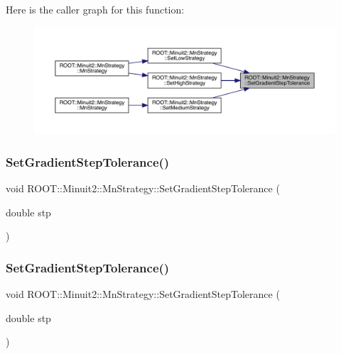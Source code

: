 Here is the caller graph for this function\+:
\nopagebreak
\begin{figure}[H]
\begin{center}
\leavevmode
\includegraphics[width=350pt]{da/de4/classROOT_1_1Minuit2_1_1MnStrategy_ad6051100db67df070103c2478740ee8f_icgraph}
\end{center}
\end{figure}
\mbox{\label{classROOT_1_1Minuit2_1_1MnStrategy_ad6051100db67df070103c2478740ee8f}} 
\subsubsection{\texorpdfstring{SetGradientStepTolerance()}{SetGradientStepTolerance()}\hspace{0.1cm}{\footnotesize\ttfamily [2/3]}}
{\footnotesize\ttfamily void R\+O\+O\+T\+::\+Minuit2\+::\+Mn\+Strategy\+::\+Set\+Gradient\+Step\+Tolerance (\begin{DoxyParamCaption}\item[{double}]{stp }\end{DoxyParamCaption})\hspace{0.3cm}{\ttfamily [inline]}}

\mbox{\label{classROOT_1_1Minuit2_1_1MnStrategy_ad6051100db67df070103c2478740ee8f}} 
\subsubsection{\texorpdfstring{SetGradientStepTolerance()}{SetGradientStepTolerance()}\hspace{0.1cm}{\footnotesize\ttfamily [3/3]}}
{\footnotesize\ttfamily void R\+O\+O\+T\+::\+Minuit2\+::\+Mn\+Strategy\+::\+Set\+Gradient\+Step\+Tolerance (\begin{DoxyParamCaption}\item[{double}]{stp }\end{DoxyParamCaption})\hspace{0.3cm}{\ttfamily [inline]}}


